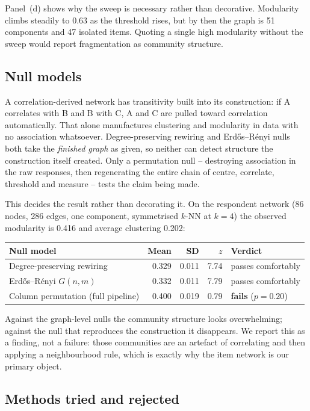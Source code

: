 Panel~(d) shows why the sweep is necessary rather than decorative. Modularity climbs
steadily to 0.63 as the threshold rises, but by then the graph is 51 components and 47
isolated items. Quoting a single high modularity without the sweep would report
fragmentation as community structure.

\subsection{Null models}
\label{subsec:nulls}

A correlation-derived network has transitivity built into its construction: if A
correlates with B and B with C, A and C are pulled toward correlation automatically. That
alone manufactures clustering and modularity in data with no association whatsoever.
Degree-preserving rewiring and Erd\H{o}s--R\'enyi nulls both take the \emph{finished
graph} as given, so neither can detect structure the construction itself created. Only a
permutation null -- destroying association in the raw responses, then regenerating the
entire chain of centre, correlate, threshold and measure -- tests the claim being made.

This decides the result rather than decorating it. On the respondent network (86 nodes,
286 edges, one component, symmetrised $k$-NN at $k=4$) the observed modularity is 0.416
and average clustering 0.202:

\begin{center}
\begin{tabular}{lrrrl}
\toprule
Null model & Mean & SD & $z$ & Verdict \\
\midrule
Degree-preserving rewiring & 0.329 & 0.011 & 7.74 & passes comfortably \\
Erd\H{o}s--R\'enyi $G(n,m)$ & 0.332 & 0.011 & 7.79 & passes comfortably \\
Column permutation (full pipeline) & 0.400 & 0.019 & 0.79 & \textbf{fails} ($p=0.20$) \\
\bottomrule
\end{tabular}
\end{center}

\noindent
Against the graph-level nulls the community structure looks overwhelming; against the null
that reproduces the construction it disappears. We report this as a finding, not a
failure: those communities are an artefact of correlating and then applying a
neighbourhood rule, which is exactly why the item network is our primary object.

\subsection{Methods tried and rejected}
\label{subsec:rejected}

